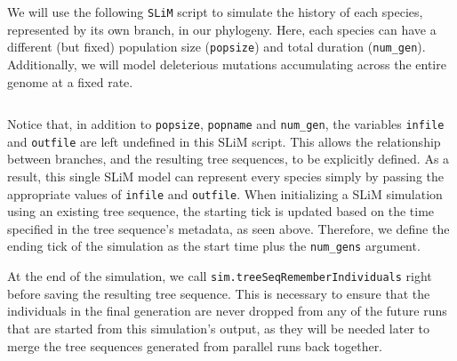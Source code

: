 \documentclass[12pt]{article}
\newcommand{\slim}[0]{\texttt{SLiM}\xspace}
\begin{document}
We will use the following \slim script to simulate the history of each species, represented by its own branch, in our phylogeny. Here, each species can have a different
(but fixed) population size (\verb|popsize|) and total duration (\verb|num_gen|). Additionally, we will model deleterious mutations accumulating across the entire genome at a fixed rate.
%
\inputminted[breaklines, breakautoindent=true, breakanywhere=true, fontsize=\small, linenos, bgcolor=gray!10]{slim}{code/parallelizing_multiple_species/simulate_branch.slim}
%
Notice that, in addition to \verb|popsize|, \verb|popname| and \verb|num_gen|, the variables \verb|infile| and \verb|outfile| are left undefined in this SLiM script.
This allows the relationship between branches, and the
resulting tree sequences, to be explicitly defined. As a result, this single SLiM model can represent every species simply by passing the appropriate values of \verb|infile| and \verb|outfile|.
When initializing a SLiM simulation using an existing tree sequence, the starting tick is updated
based on the time specified in the tree sequence's metadata, as seen above.
Therefore, we define the ending tick of the simulation as the start time plus the \verb|num_gens| argument.


At the end of the simulation, we call \verb|sim.treeSeqRememberIndividuals| right before saving the resulting tree sequence.
This is necessary to ensure that the individuals in the final generation are never dropped from any of the future runs that are started from this simulation's output,
as they will be needed later to merge the tree sequences generated from parallel runs back together.
\end{document}
